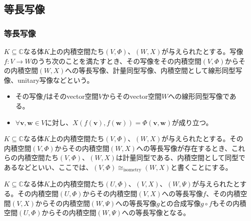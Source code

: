 \documentclass[dvipdfmx]{jsarticle}
\begin{document}
\subsection{等長写像}%
\subsubsection{等長写像}%
\begin{axs}[等長写像の公理]
$K \subseteq \mathbb{C}$なる体$K$上の内積空間たち$(V,\varPhi )$、$(W,X)$が与えられたとする。写像$f:V \rightarrow W$のうち次のことを満たすとき、その写像をその内積空間$(V,\varPhi )$からその内積空間$(W,X)$への等長写像、計量同型写像、内積空間として線形同型写像、unitary写像などという。
\begin{itemize}
\item
  その写像$f$はそのvector空間$V$からそのvector空間$W$への線形同型写像である。
\item
  $\forall\mathbf{v},\mathbf{w} \in V$に対し、$X\left( f\left( \mathbf{v} \right),f\left( \mathbf{w} \right) \right) = \varPhi \left( \mathbf{v},\mathbf{w} \right)$が成り立つ。
\end{itemize}
\end{axs}
\begin{dfn}
$K \subseteq \mathbb{C}$なる体$K$上の内積空間たち$(V,\varPhi )$、$(W,X)$が与えられたとする。その内積空間$(V,\varPhi )$からその内積空間$(W,X)$への等長写像が存在するとき、これらの内積空間たち$(V,\varPhi )$、$(W,X)$は計量同型である、内積空間として同型であるなどといい、ここでは、$(V,\varPhi ) \cong_{\mathrm{isometry}}(W,X)$と書くことにする。
\end{dfn}
\begin{thm}\label{2.3.7.1}
$K \subseteq \mathbb{C}$なる体$K$上の内積空間たち$(U,\varPhi )$、$(V,X)$、$(W,\varPsi )$が与えられたとする。その内積空間$(U,\varPhi )$からその内積空間$(V,X)$への等長写像$f$、その内積空間$(V,X)$からその内積空間$(W,\varPsi )$への等長写像$g$との合成写像$g \circ f$もその内積空間$(U,\varPhi )$からその内積空間$(W,\varPsi )$への等長写像となる。
\end{thm}
\end{document}
